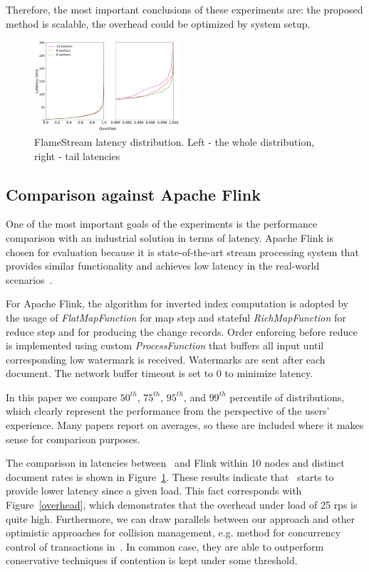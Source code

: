 Therefore, the most important conclusions of these experiments are: the proposed method is scalable, the overhead could be optimized by system setup.

\begin{figure}[htbp]
  \centering
  \includegraphics[width=0.48\textwidth]{pics/fs-index-quantiles}
  \caption{FlameStream latency distribution. Left - the whole distribution, right - tail latencies}
  \label {fs-index-quantiles}
\end{figure}

\subsection{Comparison against Apache Flink}

One of the most important goals of the experiments is the performance comparison with an industrial solution in terms of latency. Apache Flink is chosen for evaluation because it is state-of-the-art stream processing system that provides similar functionality and achieves low latency in the real-world scenarios~\cite{S7530084}. 

For Apache Flink, the algorithm for inverted index computation is adopted by the usage of {\it FlatMapFunction} for map step and stateful {\it RichMapFunction} for reduce step and for producing the change records. Order enforcing before reduce is implemented using custom {\it ProcessFunction} that buffers all input until corresponding low watermark is received. Watermarks are sent after each document. The network buffer timeout is set to 0 to minimize latency.

In this paper we compare $50^{th}$, $75^{th}$, $95^{th}$, and $99^{th}$ percentile of distributions, which clearly represent the performance from the perspective of the users' experience. Many papers report on averages, so these are included where it makes sense for comparison purposes. 

The comparison in latencies between \FlameStream\ and Flink within 10 nodes and distinct document rates is shown in Figure~\ref{fs-index-quantiles}. These results indicate that \FlameStream\ starts to provide lower latency since a given load. This fact corresponds with Figure~\ref{overhead}, which demonstrates that the overhead under load of 25 rps is quite high. Furthermore, we can draw parallels between our approach and other optimistic approaches for collision management, e.g. method for concurrency control of transactions in~\cite{Cahill:2009:SIS:1620585.1620587}. In common case, they are able to outperform conservative techniques if contention is kept under some threshold.

